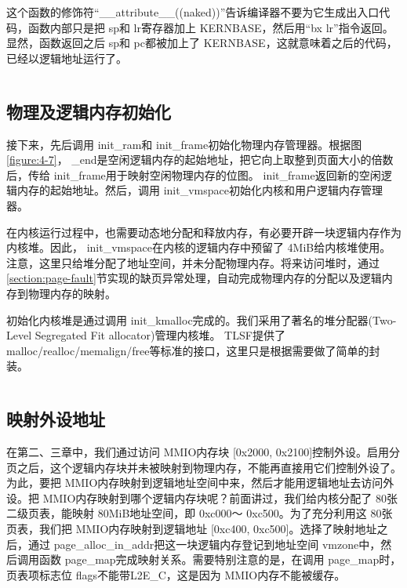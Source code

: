 \documentclass[main.tex]{subfiles}
\begin{document}
\begin{CJK*}{UTF8}{song}
这个函数的修饰符“\_\_\-attribute\_\_\-((naked))”告诉编译器不要为它生成出入口代码，函数内部只是把 sp和 lr寄存器加上 KERN\-BASE，然后用“bx lr”指令返回。显然，函数返回之后 sp和 pc都被加上了 KERN\-BASE，这就意味着之后的代码，已经以逻辑地址运行了。

\begin{code}
\label{code:4-25}
\inputminted[firstline=337,lastline=345,linenos,numbersep=5pt,frame=lines,framesep=2mm]{c}{src/chapter04/kernel/machdep.c}
\end{code}

\subsection{物理及逻辑内存初始化}
接下来，先后调用 init\_\-ram和 init\_\-frame初始化物理内存管理器。根据图\ref{figure:4-7}， \_end是空闲逻辑内存的起始地址，把它向上取整到页面大小的倍数后，传给 init\_\-frame用于映射空闲物理内存的位图。 init\_\-frame返回新的空闲逻辑内存的起始地址。然后，调用 init\_\-vmspace初始化内核和用户逻辑内存管理器。

\par
在内核运行过程中，也需要动态地分配和释放内存，有必要开辟一块逻辑内存作为内核堆。因此， init\_\-vmspace在内核的逻辑内存中预留了 4\-MiB给内核堆使用。注意，这里只给堆分配了地址空间，并未分配物理内存。将来访问堆时，通过\ref{section:page-fault}节实现的缺页异常处理，自动完成物理内存的分配以及逻辑内存到物理内存的映射。

\par
初始化内核堆是通过调用 init\_\-kmalloc完成的。我们采用了著名的堆分配器(Two-Level Segregated Fit allocator)管理内核堆。 TLSF提供了malloc/\-realloc/\-memalign/\-free等标准的接口，这里只是根据需要做了简单的封装。

\begin{code}
\label{code:4-26}
\inputminted[firstline=362,lastline=377,linenos,numbersep=5pt,frame=lines,framesep=2mm]{c}{src/chapter04/kernel/machdep.c}
\end{code}

\subsection{映射外设地址}
在第二、三章中，我们通过访问 MMIO内存块 [0x2000, 0x2100]控制外设。启用分页之后，这个逻辑内存块并未被映射到物理内存，不能再直接用它们控制外设了。为此，要把 MMIO内存映射到逻辑地址空间中来，然后才能用逻辑地址去访问外设。把 MMIO内存映射到哪个逻辑内存块呢？前面讲过，我们给内核分配了 80张二级页表，能映射 80\-MiB地址空间，即 0xc000～ 0xc500。为了充分利用这 80张页表，我们把 MMIO内存映射到逻辑地址 [0xc400,  0xc500]。选择了映射地址之后，通过 page\_\-alloc\_\-in\_\-addr把这一块逻辑内存登记到地址空间 vm\-zone中，然后调用函数 page\_\-map完成映射关系。需要特别注意的是，在调用 page\_\-map时，页表项标志位 flags不能带L2E\_\-C，这是因为 MMIO内存不能被缓存。


\end{CJK*}
\end{document}
